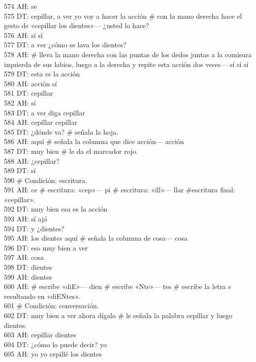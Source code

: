 574 AH: se\\
575 DT: cepillar, a ver yo voy a hacer la acción \# con la mano derecha hace el gesto de «cepillar los dientes»--- ¿usted lo hace?\\
576 AH: sí sí\\
577 DT: a ver ¿cómo se lava los dientes?\\
578 AH: \# lleva la mano derecha con las puntas de los dedos juntas a la comisura izquierda de sus labios, luego a la derecha y repite esta acción dos veces--- sí sí sí\\
579 DT: esta es la acción\\
580 AH: acción sí\\
581 DT: cepillar\\
582 AH: sí\\
583 DT: a ver diga cepillar\\
584 AH: cepillar cepillar\\
585 DT: ¿dónde va? \# señala la hoja.\\
586 AH: aquí \# señala la columna que dice acción--- acción\\
587 DT: muy bien \# le da el marcador rojo.\\
588 AH: ¿cepillar?\\
589 DT: sí\\
590 \# Condición: escritura.\\
591 AH: ce \# escritura: «cep»--- pi \# escritura: «ill»--- llar \#escritura final: «cepillar».\\
592 DT: muy bien esa es la acción\\
593 AH: sí ajá\\
594 DT: y ¿dientes?\\
595 AH: los dientes aquí \# señala la columna de cosa--- cosa\\
596 DT: eso muy bien a ver\\
597 AH: cosa\\
598 DT: dientes\\
599 AH: dientes\\
600 AH: \# escribe «diE»--- dien \# escribe «Nte»--- tes \# escribe la letra s resultando en «diENtes».\\
601 \# Condición: conversación.\\
602 DT: muy bien a ver ahora dígalo \# le señala la palabra cepillar y luego dientes.\\
603 AH: cepillar dientes\\
604 DT: ¿cómo lo puede decir? yo\\
605 AH: yo yo cepillé los dientes\\
